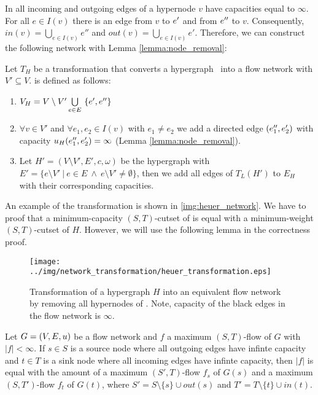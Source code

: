 In  all incoming and outgoing edges of a hypernode $v$ have
capacities equal to $\infty$. For all $e \in I(v)$ there is an edge from $v$
to $e'$ and from $e''$ to $v$. Consequently, $in(v) = \bigcup_{e \in I(v)} e''$
and $out(v) = \bigcup_{e \in I(v)} e'$. Therefore, we can construct the
following network with Lemma \ref{lemma:node_removal}:

\begin{definition}
Let $T_H$ be a transformation that converts a hypergraph \HypergraphDef~into 
a flow network  with $V' \subseteq V$.  is defined as follows:
\begin{enumerate}
\item $V_H = V\setminus V' \bigcup\limits_{e \in E}\ \{e', e''\}$
\item $\forall v \in V'$ and $\forall e_1,e_2 \in I(v)$ with $e_1 \neq e_2$ we add a directed
      edge $(e_1'',e_2')$ with capacity $u_H(e_1'',e_2') = \infty$
      (Lemma \ref{lemma:node_removal}).
\item Let $H' = (V\setminus V',E',c,\omega)$ be the hypergraph with 
      $E' = \{e\setminus V' \ |\ e \in E\ \land \ e \setminus V' \neq \emptyset \}$,
      then we add all edges of $T_L(H')$ to $E_H$ with their corresponding capacities.
\end{enumerate} 
\end{definition}

An example of the transformation is shown in \autoref{img:heuer_network}.
We have to proof that a minimum-capacity $(S,T)$-cutset
of  is equal with a minimum-weight $(S,T)$-cutset of $H$. However,
we will use the following lemma in the correctness proof.

\begin{figure}
\centering
\texttt{[image: ../img/network\_transformation/heuer\_transformation.eps]}
\caption{Transformation of a hypergraph $H$ into an equivalent flow network  by removing
         all hypernodes of . Note, capacity of the black edges in the flow network is $\infty$.}
\label{img:heuer_network}
\end{figure}

\begin{lemma}
\label{lemma:source_and_sink_removal}
Let $G = (V,E,u)$ be a flow network and $f$ a maximum $(S,T)$-flow of $G$ with $|f| < \infty$.
If $s \in S$ is a source node where all outgoing edges have infinte capacity and
$t \in T$ is a sink node where all incoming edges have infinte capacity, then
$|f|$ is equal with the amount of a maximum $(S',T)$-flow $f_s$ of $G(s)$ and a maximum
$(S,T')$-flow $f_t$ of $G(t)$, where $S' = S\setminus \{s\} \cup out(s)$ 
and $T' = T \setminus \{t\} \cup in(t)$.
\end{lemma}


